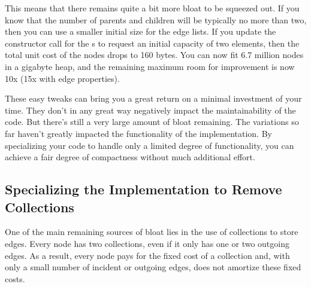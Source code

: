 This means that there remains quite a bit more bloat to be squeezed out. If you
know that the number of parents and children will be typically no more than two,
then you can use a smaller initial size for the edge lists. If you update the
constructor call for the s to request an initial capacity of
two elements, then the total unit cost of the nodes drops to 160 bytes. You can
now fit 6.7 million nodes in a gigabyte heap, and the remaining maximum room for
improvement is now 10x (15x with edge properties).



These easy tweaks can bring you a great return on a minimal investment of your
time. They don't in any great way negatively impact the maintainability of the
code. But there's still a very large amount of bloat remaining. The variations
so far haven't greatly impacted the functionality of the implementation. By
specializing your code to handle only a limited degree of functionality, you can
achieve a fair degree of compactness without much additional effort.

\subsection{Specializing the Implementation to Remove Collections}
One of the main remaining sources of bloat lies in the use of collections to
store edges. Every node has two collections, even if it only has one or two
outgoing edges. As a result, every node pays for the fixed cost of a collection
and, with only a small number of incident or outgoing edges, does not amortize
these fixed costs.


